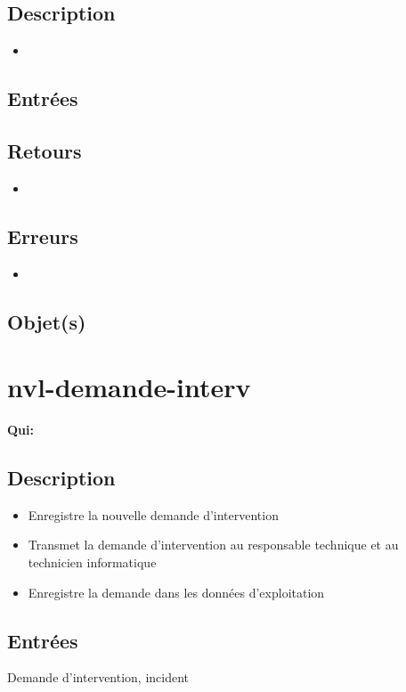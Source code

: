 	\subsection{Description}
	\begin{itemize}
		\item 
	\end{itemize}

	\subsection{Entrées}

	\subsection{Retours}
	\begin{itemize}
		\item 
	\end{itemize}

	\subsection{Erreurs}
	\begin{itemize}
		\item 
	\end{itemize}

	\subsection{Objet(s)}

\section{nvl-demande-interv}
	\textbf{Qui:} \us

	\subsection{Description}
	\begin{itemize}
		\item Enregistre la nouvelle demande d'intervention
		\item Transmet la demande d'intervention au responsable technique et au technicien informatique
		\item Enregistre la demande dans les données d'exploitation
	\end{itemize}

	\subsection{Entrées}
		Demande d'intervention, incident

